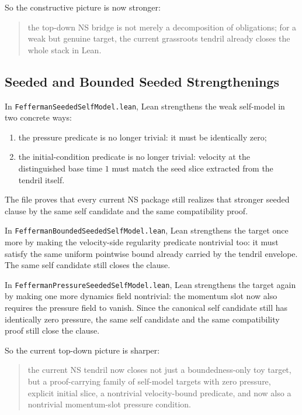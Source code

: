 \documentclass[11pt]{article}
\begin{document}
So the constructive picture is now stronger:
\begin{quote}
the top-down NS bridge is not merely a decomposition of obligations; for a weak
but genuine target, the current grassroots tendril already closes the whole
stack in Lean.
\end{quote}

\subsection{Seeded and Bounded Seeded Strengthenings}

In \texttt{FeffermanSeededSelfModel.lean}, Lean strengthens the weak self-model
in two concrete ways:
\begin{enumerate}[leftmargin=1.5em]
  \item the pressure predicate is no longer trivial: it must be identically
  zero;
  \item the initial-condition predicate is no longer trivial: velocity at the
  distinguished base time \(1\) must match the seed slice extracted from the
  tendril itself.
\end{enumerate}

The file proves that every current NS package still realizes that stronger
seeded clause by the same self candidate and the same compatibility proof.

In \texttt{FeffermanBoundedSeededSelfModel.lean}, Lean strengthens the target
once more by making the velocity-side regularity predicate nontrivial too: it
must satisfy the same uniform pointwise bound already carried by the tendril
envelope.  The same self candidate still closes the clause.

In \texttt{FeffermanPressureSeededSelfModel.lean}, Lean strengthens the target
again by making one more dynamics field nontrivial: the momentum slot now also
requires the pressure field to vanish.  Since the canonical self candidate still
has identically zero pressure, the same self candidate and the same
compatibility proof still close the clause.

So the current top-down picture is sharper:
\begin{quote}
the current NS tendril now closes not just a boundedness-only toy target, but a
proof-carrying family of self-model targets with zero pressure, explicit
initial slice, a nontrivial velocity-bound predicate, and now also a nontrivial
momentum-slot pressure condition.
\end{quote}
\end{document}
